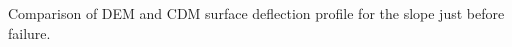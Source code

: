 \label{fig:surfacedeflection} Comparison of DEM and CDM surface deflection profile for the slope just before failure. 